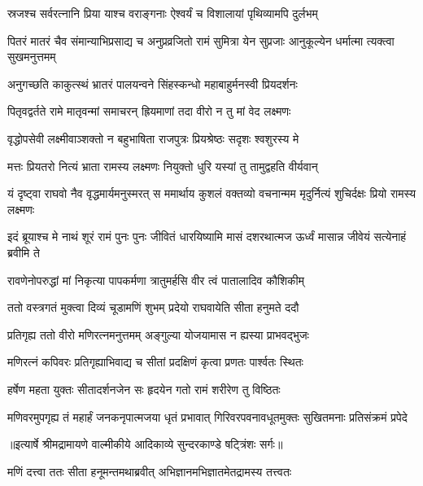 \twolineshloka
{स्रजश्च सर्वरत्नानि प्रिया याश्च वराङ्गनाः}
{ऐश्वर्यं च विशालायां पृथिव्यामपि दुर्लभम्} %

\threelineshloka
{पितरं मातरं चैव संमान्याभिप्रसाद्य च}
{अनुप्रव्रजितो रामं सुमित्रा येन सुप्रजाः}
{आनुकूल्येन धर्मात्मा त्यक्त्वा सुखमनुत्तमम्} %

\twolineshloka
{अनुगच्छति काकुत्स्थं भ्रातरं पालयन्वने}
{सिंहस्कन्धो महाबाहुर्मनस्वी प्रियदर्शनः} %

\twolineshloka
{पितृवद्वर्तते रामे मातृवन्मां समाचरन्}
{ह्रियमाणां तदा वीरो न तु मां वेद लक्ष्मणः} %

\twolineshloka
{वृद्धोपसेवी लक्ष्मीवाञ्शक्तो न बहुभाषिता}
{राजपुत्रः प्रियश्रेष्ठः सदृशः श्वशुरस्य मे} %

\twolineshloka
{मत्तः प्रियतरो नित्यं भ्राता रामस्य लक्ष्मणः}
{नियुक्तो धुरि यस्यां तु तामुद्वहति वीर्यवान्} %

\threelineshloka
{यं दृष्ट्वा राघवो नैव वृद्धमार्यमनुस्मरत्}
{स ममार्थाय कुशलं वक्तव्यो वचनान्मम}
{मृदुर्नित्यं शुचिर्दक्षः प्रियो रामस्य लक्ष्मणः} %

\threelineshloka
{इदं ब्रूयाश्च मे नाथं शूरं रामं पुनः पुनः}
{जीवितं धारयिष्यामि मासं दशरथात्मज}
{ऊर्ध्वं मासान्न जीवेयं सत्येनाहं ब्रवीमि ते} %

\twolineshloka
{रावणेनोपरुद्धां मां निकृत्या पापकर्मणा}
{त्रातुमर्हसि वीर त्वं पातालादिव कौशिकीम्} %

\twolineshloka
{ततो वस्त्रगतं मुक्त्वा दिव्यं चूडामणिं शुभम्}
{प्रदेयो राघवायेति सीता हनुमते ददौ} %

\twolineshloka
{प्रतिगृह्य ततो वीरो मणिरत्नमनुत्तमम्}
{अङ्गुल्या योजयामास न ह्यस्या प्राभवद्भुजः} %

\twolineshloka
{मणिरत्नं कपिवरः प्रतिगृह्याभिवाद्य च}
{सीतां प्रदक्षिणं कृत्वा प्रणतः पार्श्वतः स्थितः} %

\twolineshloka
{हर्षेण महता युक्तः सीतादर्शनजेन सः}
{हृदयेन गतो रामं शरीरेण तु विष्ठितः} %

\fourlineindentedshloka
{मणिवरमुपगृह्य तं महार्हं}
{ जनकनृपात्मजया धृतं प्रभावात्}
{गिरिवरपवनावधूतमुक्तः}
{ सुखितमनाः प्रतिसंक्रमं प्रपेदे} %


{॥इत्यार्षे श्रीमद्रामायणे वाल्मीकीये आदिकाव्ये सुन्दरकाण्डे षट्त्रिंशः सर्गः॥}


\twolineshloka
{मणिं दत्त्वा ततः सीता हनूमन्तमथाब्रवीत्}
{अभिज्ञानमभिज्ञातमेतद्रामस्य तत्त्वतः} %

